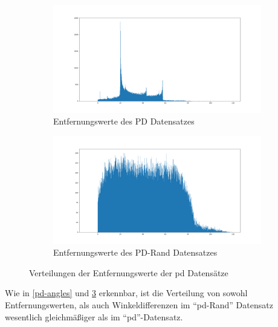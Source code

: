 \begin{figure}[H]
	\centering
	\begin{subfigure}[h]{0.5\textwidth}
		\centering
		\includegraphics[width=\linewidth]{kapitel4/images/plots/pd-distances.png}
		\caption{Entfernungswerte des PD Datensatzes}
		\label{pd-drive-distances}
	\end{subfigure}%
	\begin{subfigure}[h]{0.5\textwidth}
		\centering
		\includegraphics[width=\linewidth]{kapitel4/images/plots/pd-rand-distances.png}
		\caption{Entfernungswerte des PD-Rand Datensatzes}
		\label{pd-rand-distances}
	\end{subfigure}
	\caption{Verteilungen der Entfernungswerte der \acs{pd} Datensätze}
	\label{pd-distances}
\end{figure}

Wie in \ref{pd-angles} und \ref{pd-distances} erkennbar, ist die Verteilung von sowohl Entfernungswerten, als auch Winkeldifferenzen im  ``\acs{pd}-Rand'' Datensatz wesentlich gleichmäßiger als im ``\acs{pd}''-Datensatz.


